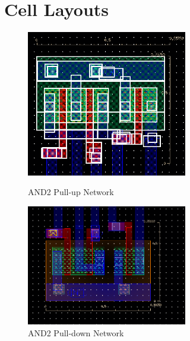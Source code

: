\documentclass{article}
\begin{document}
\newpage

\clearpage
\section{Cell Layouts} 

\begin{figure}[ht]
\centering
\parbox{8cm}{
\includegraphics[width=7cm]{final_cells/AND2_PMOS}
  \caption{AND2 Pull-up Network}
\label{fig:AND2_pmos}}
\qquad
\begin{minipage}{7cm}
\includegraphics[width=7cm]{final_cells/AND2_NMOS}
  \caption{AND2 Pull-down Network}
\label{fig:AND2_nmos}
\end{minipage}
\end{figure}
\end{document}
